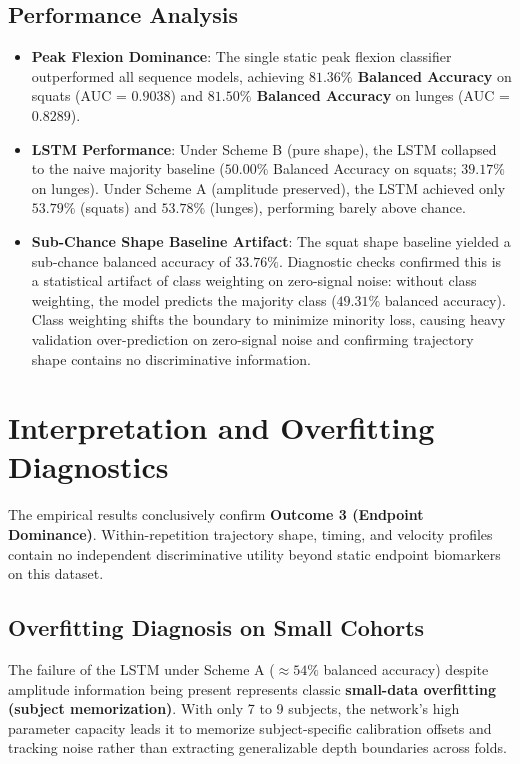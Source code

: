 \subsection{Performance Analysis}
\label{sec:13-3-1-performance-analysis}

\begin{itemize}
  \item \textbf{Peak Flexion Dominance}: The single static peak flexion classifier outperformed all sequence models, achieving \textbf{$81.36\%$ Balanced Accuracy} on squats (AUC = $0.9038$) and \textbf{$81.50\%$ Balanced Accuracy} on lunges (AUC = $0.8289$).
  \item \textbf{LSTM Performance}: Under Scheme B (pure shape), the LSTM collapsed to the naive majority baseline ($50.00\%$ Balanced Accuracy on squats; $39.17\%$ on lunges). Under Scheme A (amplitude preserved), the LSTM achieved only $53.79\%$ (squats) and $53.78\%$ (lunges), performing barely above chance.
  \item \textbf{Sub-Chance Shape Baseline Artifact}: The squat shape baseline yielded a sub-chance balanced accuracy of $33.76\%$. Diagnostic checks confirmed this is a statistical artifact of class weighting on zero-signal noise: without class weighting, the model predicts the majority class ($49.31\%$ balanced accuracy). Class weighting shifts the boundary to minimize minority loss, causing heavy validation over-prediction on zero-signal noise and confirming trajectory shape contains no discriminative information.
\end{itemize}



\section{Interpretation and Overfitting Diagnostics}
\label{sec:13-4-interpretation-and-overfitting-diagnostics}


The empirical results conclusively confirm \textbf{Outcome 3 (Endpoint Dominance)}. Within-repetition trajectory shape, timing, and velocity profiles contain no independent discriminative utility beyond static endpoint biomarkers on this dataset.

\subsection{Overfitting Diagnosis on Small Cohorts}
\label{sec:13-4-1-overfitting-diagnosis-on-small-cohorts}

The failure of the LSTM under Scheme A ($\approx 54\%$ balanced accuracy) despite amplitude information being present represents classic \textbf{small-data overfitting (subject memorization)}. With only 7 to 9 subjects, the network's high parameter capacity leads it to memorize subject-specific calibration offsets and tracking noise rather than extracting generalizable depth boundaries across folds.


